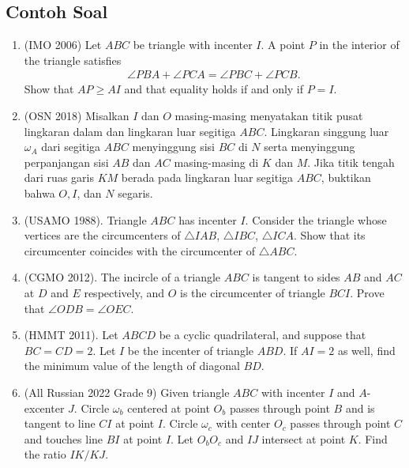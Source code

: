 \documentclass[11pt]{scrartcl}
\begin{document}
\subsection{Contoh Soal}
\begin{enumerate}
\item (IMO 2006) Let $ABC$ be triangle with incenter $I$. A point $P$ in the interior of the triangle satisfies
\begin{align*}
    \angle PBA + \angle PCA = \angle PBC + \angle PCB.
\end{align*}
Show that $AP \ge AI$ and that equality holds if and only if $P=I$.

\item (OSN 2018) Misalkan $I$ dan $O$ masing-masing menyatakan titik pusat lingkaran dalam dan lingkaran luar segitiga $ABC$. Lingkaran singgung luar $\omega_A$ dari segitiga $ABC$ menyinggung sisi $BC$ di $N$ serta menyinggung perpanjangan sisi $AB$ dan $AC$ masing-masing di $K$ dan $M$. Jika titik tengah dari ruas garis $KM$ berada pada lingkaran luar segitiga $ABC$, buktikan bahwa $O,I$, dan $N$ segaris.

\item (USAMO 1988). Triangle $ABC$ has incenter $I$. Consider the triangle whose vertices are the circumcenters of $\triangle IAB$, $\triangle IBC$, $\triangle ICA$. Show that its circumcenter coincides with the circumcenter of $\triangle ABC$.

\item (CGMO 2012). The incircle of a triangle $ABC$ is tangent to sides $AB$ and $AC$ at $D$ and $E$ respectively, and $O$ is the circumcenter of triangle $BCI$. Prove that $\angle ODB = \angle OEC$.

\item (HMMT 2011). Let $ABCD$ be a cyclic quadrilateral, and suppose that $BC = CD = 2$. Let $I$ be the incenter of triangle $ABD$. If $AI = 2$ as well, find the minimum value of the length of diagonal $BD$.

\item (All Russian 2022 Grade 9) Given triangle $ABC$ with incenter $I$ and $A$-excenter $J$. Circle $\omega_b$ centered at point $O_b$ passes through point $B$ and is tangent to line $CI$ at point $I$. Circle $\omega_c$ with center $O_c$ passes through point $C$ and touches line $BI$ at point $I$. Let $O_bO_c$ and $IJ$ intersect at point $K$. Find the ratio $IK/KJ$.
\end{enumerate}
\end{document}
